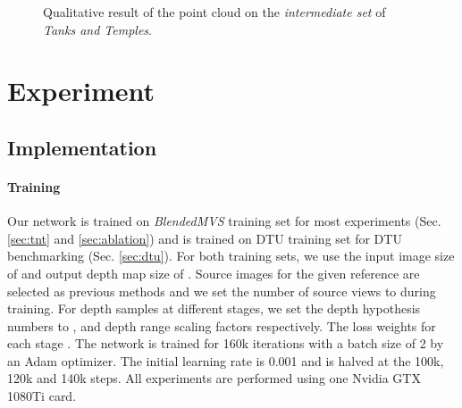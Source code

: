 \documentclass{bmvc2k}
\begin{document}
\begin{figure}[]
	\centering
	\caption{Qualitative result of the point cloud on the \textit{intermediate set} of \textit{Tanks and Temples}. }
	\vspace{-3mm}
	\label{fig:tanks}
\end{figure}

\section{Experiment}

\subsection{Implementation}\label{sec:implementation}
\paragraph{Training}
Our network is trained on \textit{BlendedMVS} \cite{yao2020blendedmvs} training set for most experiments (Sec. \ref{sec:tnt} and \ref{sec:ablation}) and is trained on DTU training set \cite{jensen2014large} for DTU benchmarking (Sec. \ref{sec:dtu}). For both training sets, we use the input image size of  and output depth map size of . Source images for the given reference are selected as previous methods \cite{yao2018mvsnet,yao2019recurrent} and we set the number of source views to  during training. For depth samples at different stages, we set the depth hypothesis numbers to , and depth range scaling factors  respectively. The loss weights for each stage . The network is trained for 160k iterations with a batch size of 2 by an Adam \cite{kingma2014adam} optimizer. The initial learning rate is 0.001 and is halved at the 100k, 120k and 140k steps. All experiments are performed using one Nvidia GTX 1080Ti card.
\end{document}
